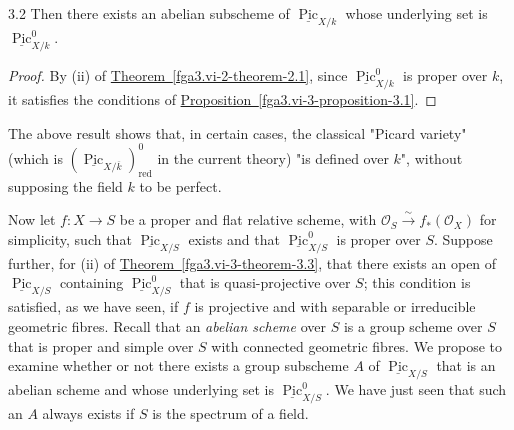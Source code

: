 \begin{corollary}{3.2}
    Then there exists an abelian subscheme of \(\underline {\operatorname {Pic}}_{X/k}\) whose underlying set is \(\underline {\operatorname {Pic}}_{X/k}^0\).\begin{proof}\par{}By (ii) of \hyperref[fga3.vi-2-theorem-2.1]{Theorem~\ref*{fga3.vi-2-theorem-2.1}}, since \(\underline {\operatorname {Pic}}_{X/k}^0\) is proper over \(k\), it satisfies the conditions of \hyperref[fga3.vi-3-proposition-3.1]{Proposition~\ref*{fga3.vi-3-proposition-3.1}}.\end{proof}\end{corollary}\par{}The above result shows that, in certain cases, the classical "Picard variety" (which is \((\underline {\operatorname {Pic}}_{X/\overline {k}})_\mathrm {red}^0\) in the current theory) "is defined over \(k\)", without supposing the field \(k\) to be perfect.\par{}Now let \(f\colon  X\to  S\) be a proper and flat relative scheme, with \(\mathcal {O}_S\xrightarrow {\sim } f_*(\mathcal {O}_X)\) for simplicity, such that \(\underline {\operatorname {Pic}}_{X/S}\) exists and that \(\underline {\operatorname {Pic}}_{X/S}^0\) is proper over \(S\).
  Suppose further, for (ii) of \hyperref[fga3.vi-3-theorem-3.3]{Theorem~\ref*{fga3.vi-3-theorem-3.3}}, that there exists an open of \(\underline {\operatorname {Pic}}_{X/S}\) containing \(\underline {\operatorname {Pic}}_{X/S}^0\) that is quasi-projective over \(S\);
  this condition is satisfied, as we have seen, if \(f\) is projective and with separable or irreducible geometric fibres.
  Recall that an \emph{abelian scheme} over \(S\) is a group scheme over \(S\) that is proper and simple over \(S\) with connected geometric fibres.
  We propose to examine whether or not there exists a group subscheme \(A\) of \(\underline {\operatorname {Pic}}_{X/S}\) that is an abelian scheme and whose underlying set is \(\underline {\operatorname {Pic}}_{X/S}^0\).
  We have just seen that such an \(A\) always exists if \(S\) is the spectrum of a field.
